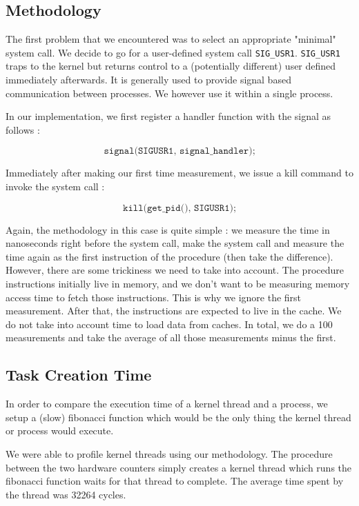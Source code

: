 \subsection{Methodology}

The first problem that we encountered was to select an appropriate "minimal" system call. We decide to
go for a user-defined system call \texttt{SIG\_USR1}. \texttt{SIG\_USR1} traps to the kernel but returns control
to a (potentially different) user defined immediately afterwards. It is generally used to provide signal based
communication between processes. We however use it within a single process.

In our implementation, we first register a handler function with the signal as follows :

$$ \texttt{signal(SIGUSR1, signal\_handler);}$$

Immediately after making our first time measurement, we issue a kill command to
invoke the system call :

$$ \texttt{kill(get\_pid(), SIGUSR1);}$$

Again, the methodology in this case is quite simple : we measure the time in nanoseconds
right before the system call, make the system call and measure the time again
as the first instruction of the procedure (then take the difference). However, there are some trickiness we need to take
into account. The procedure instructions initially live in memory, and we don't want to be
measuring memory access time to fetch those instructions. This is why we ignore the 
first measurement. After that, the instructions are expected to live in the cache. We do
not take into account time to load data from caches. In total, we do a 100 measurements
and take the average of all those measurements minus the first.

\subsection{Task Creation Time}

In order to compare the execution time of a kernel thread and a process, we
setup a (slow) fibonacci function which would be the only thing the kernel
thread or process would execute.

We were able to profile kernel threads using our methodology. The procedure
between the two hardware counters simply creates a kernel thread which runs the
fibonacci function waits for that thread to complete. The average time spent by
the thread was 32264 cycles.

